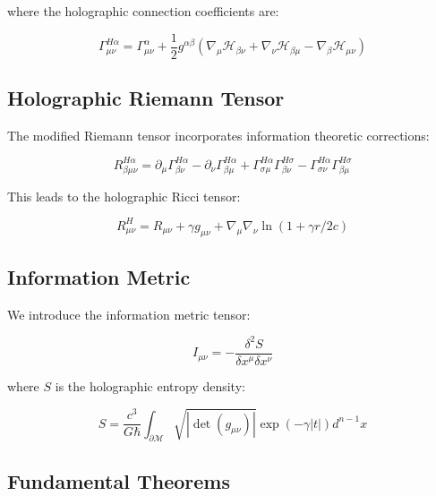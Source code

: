 \documentclass[12pt]{article}
\theoremstyle{plain}
\theoremstyle{definition}
\theoremstyle{remark}
\begin{document}
where the holographic connection coefficients are:

\begin{equation}
\Gamma^{H\alpha}_{\mu\nu} = \Gamma^{\alpha}_{\mu\nu} + \frac{1}{2}g^{\alpha\beta}(\nabla_{\mu}\mathcal{H}_{\beta\nu} + \nabla_{\nu}\mathcal{H}_{\beta\mu} - \nabla_{\beta}\mathcal{H}_{\mu\nu})
\end{equation}

\subsection{Holographic Riemann Tensor}

The modified Riemann tensor incorporates information theoretic corrections:

\begin{equation}
R^{H\alpha}_{\beta\mu\nu} = \partial_{\mu}\Gamma^{H\alpha}_{\beta\nu} - \partial_{\nu}\Gamma^{H\alpha}_{\beta\mu} + \Gamma^{H\alpha}_{\sigma\mu}\Gamma^{H\sigma}_{\beta\nu} - \Gamma^{H\alpha}_{\sigma\nu}\Gamma^{H\sigma}_{\beta\mu}
\end{equation}

This leads to the holographic Ricci tensor:

\begin{equation}
R^H_{\mu\nu} = R_{\mu\nu} + \gamma g_{\mu\nu} + \nabla_{\mu}\nabla_{\nu}\ln(1 + \gamma r/2c)
\end{equation}

\subsection{Information Metric}

We introduce the information metric tensor:

\begin{equation}
I_{\mu\nu} = -\frac{\delta^2 S}{\delta x^{\mu}\delta x^{\nu}}
\end{equation}

where $S$ is the holographic entropy density:

\begin{equation}
S = \frac{c^3}{G\hbar}\int_{\partial\mathcal{M}} \sqrt{|\det(g_{\mu\nu})|} \exp(-\gamma|t|) d^{n-1}x
\end{equation}

\subsection{Fundamental Theorems}
\end{document}
